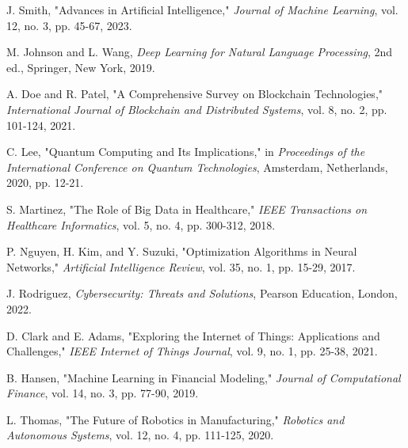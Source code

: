 
\begin{thebibliography}{99}

 J. Smith, "Advances in Artificial Intelligence," \textit{Journal of Machine Learning}, vol. 12, no. 3, pp. 45-67, 2023.

 M. Johnson and L. Wang, \textit{Deep Learning for Natural Language Processing}, 2nd ed., Springer, New York, 2019.

 A. Doe and R. Patel, "A Comprehensive Survey on Blockchain Technologies," \textit{International Journal of Blockchain and Distributed Systems}, vol. 8, no. 2, pp. 101-124, 2021.

 C. Lee, "Quantum Computing and Its Implications," in \textit{Proceedings of the International Conference on Quantum Technologies}, Amsterdam, Netherlands, 2020, pp. 12-21.

 S. Martinez, "The Role of Big Data in Healthcare," \textit{IEEE Transactions on Healthcare Informatics}, vol. 5, no. 4, pp. 300-312, 2018.

 P. Nguyen, H. Kim, and Y. Suzuki, "Optimization Algorithms in Neural Networks," \textit{Artificial Intelligence Review}, vol. 35, no. 1, pp. 15-29, 2017.

 J. Rodriguez, \textit{Cybersecurity: Threats and Solutions}, Pearson Education, London, 2022.

 D. Clark and E. Adams, "Exploring the Internet of Things: Applications and Challenges," \textit{IEEE Internet of Things Journal}, vol. 9, no. 1, pp. 25-38, 2021.

 B. Hansen, "Machine Learning in Financial Modeling," \textit{Journal of Computational Finance}, vol. 14, no. 3, pp. 77-90, 2019.

 L. Thomas, "The Future of Robotics in Manufacturing," \textit{Robotics and Autonomous Systems}, vol. 12, no. 4, pp. 111-125, 2020.

\end{thebibliography}



